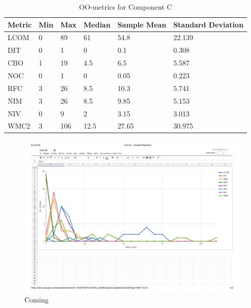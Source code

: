 \begin{table}[]
\centering
\caption{OO-metrics for Component C}
\label{tab:oometrics-config}
\begin{tabular}{|l|l|l|l|l|l|}
\hline
\textbf{Metric} & \textbf{Min} & \textbf{Max} & \textbf{Median} & \textbf{Sample Mean} & \textbf{Standard Deviation} \\ \hline
LCOM            & 0            & 89           & 61              & 54.8                 & 22.139                       \\ \hline
DIT             & 0            & 1            & 0               & 0.1                  & 0.308                       \\ \hline
CBO             & 1            & 19           & 4.5               & 6.5                 & 5.587                       \\ \hline
NOC             & 0            & 1            & 0               & 0.05                    & 0.223                           \\ \hline
RFC             & 3            & 26           & 8.5             & 10.3                 & 5.741                       \\ \hline
NIM             & 3            & 26           & 8.5             & 9.85                 & 5.153                       \\ \hline
NIV             & 0            & 9            & 2               & 3.15                 & 3.013                       \\ \hline
WMC2            & 3            & 106          & 12.5              & 27.65                 & 30.975                      \\ \hline
\end{tabular}
\end{table}



\begin{landscape}
\setlength\LTleft{-.5in}
	\begin{figure}
	\centering
	\includegraphics[width=\textwidth]{images/pdf/conf.pdf}
	\caption{Coming}
	\label{fig:confgraph}
	\end{figure}
\end{landscape}


